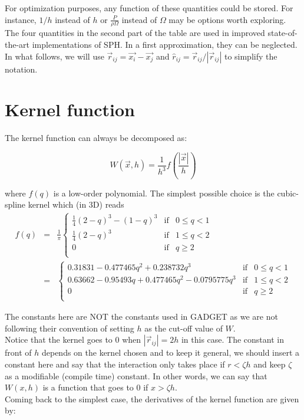 \documentclass[a4paper,10pt]{report}
\begin{document}
For optimization purposes, any function of these quantities could be stored. For instance, $1/h$ instead of $h$ or
$\frac{P}{\rho\Omega}$ instead of $\Omega$ may be options worth exploring. \\

The four quantities in the second part of the table are used in improved state-of-the-art implementations of SPH. In a
first approximation, they can be neglected. \\

In what follows, we will use $\vec{r}_{ij} = \vec{x_i} - \vec{x_j}$ and $\hat{r}_{ij} = \vec{r}_{ij}/|\vec{r}_{ij}|$
to simplify the notation.

\section{Kernel function}

The kernel function can always be decomposed as:

\begin{equation}
 W(\vec{x}, h) = \frac{1}{h^3}f\left(\frac{|\vec{x}|}{h}\right) 
\end{equation}

where $f(q)$ is a low-order polynomial. The simplest possible choice is the cubic-spline kernel which (in 3D) reads
\begin{eqnarray*}
 f(q) &=& \frac{1}{\pi}\left\lbrace \begin{array}{rcl}
                      \frac{1}{4}(2-q)^3 - (1-q)^3 & \mbox{if} & 0 \leq q < 1 \\
		      \frac{1}{4}(2-q)^3 & \mbox{if} & 1 \leq q < 2 \\
		      0 & \mbox{if} & q \geq 2 \\
                     \end{array}
 \right. \\
&=&\left\lbrace \begin{array}{rcl}
    0.31831 -0.477465 q^2+0.238732 q^3& \mbox{if} & 0 \leq q < 1 \\
   0.63662 -0.95493 q+0.477465 q^2-0.0795775 q^3  & \mbox{if} & 1 \leq q < 2 \\
		      0 & \mbox{if} & q \geq 2 \\
                     \end{array}
 \right.
\end{eqnarray*}

The constants here are NOT the constants used in GADGET as we are not following their convention of setting $h$ as the
cut-off value of $W$.\\
Notice that the kernel goes to $0$ when $|\vec{r}_{ij}| = 2h$ in this case. The constant in front of $h$ depends on the
kernel
chosen and to keep it general, we should insert a constant here and say that the interaction only takes place if
$r<\zeta h$ and keep $\zeta$ as a modifiable (compile time) constant. In other words, we can say that $W(x,h)$ is a
function that goes to $0$ if $x > \zeta h$. \\
Coming back to the simplest case, the derivatives of the kernel function are given by:
\end{document}
